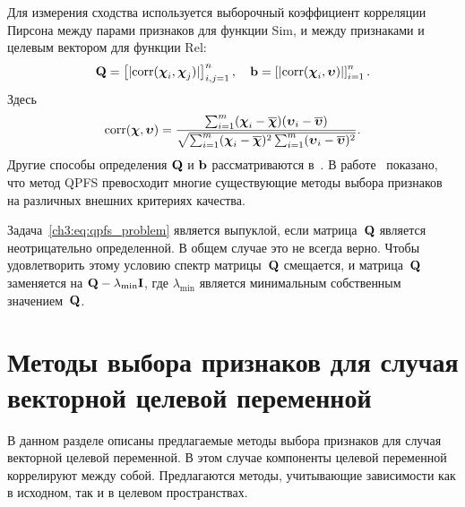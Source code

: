 Для измерения сходства используется выборочный коэффициент корреляции Пирсона между парами признаков для функции Sim, и между признаками и целевым вектором для функции Rel:
\begin{equation}
	\mathbf{Q} = \left[|\text{corr}(\boldsymbol{\chi}_i, \boldsymbol{\chi}_j)|\right]_{i,j=1}^n, \quad \mathbf{b} = \left[|\text{corr}(\boldsymbol{\chi}_i, \boldsymbol{\upsilon})|\right]_{i=1}^n.
	\label{ch3:eq:qpfs_1d_qb}
\end{equation}
Здесь
\begin{equation*}
\text{corr}(\boldsymbol{\chi}, \boldsymbol{\upsilon}) = \frac{\sum_{i=1}^m(\boldsymbol{\chi}_i - \overline{\boldsymbol{\chi}})( \boldsymbol{\upsilon}_i - \overline{\boldsymbol{\upsilon}})}{\sqrt{\sum_{i=1}^m(\boldsymbol{\chi}_i - \overline{\boldsymbol{\chi}})^2\sum_{i=1}^m(\boldsymbol{\upsilon}_i - \overline{\boldsymbol{\upsilon}})^2}}.
\end{equation*}
Другие способы определения $\mathbf{Q}$ и $\mathbf{b}$ рассматриваются в~\cite{katrutsa2017comprehensive}. 
В работе~\cite{katrutsa2017comprehensive} показано, что метод QPFS превосходит многие существующие методы выбора признаков на различных внешних критериях качества.

Задача~\eqref{ch3:eq:qpfs_problem} является выпуклой, если матрица~$\mathbf{Q}$ является неотрицательно определенной. В общем случае это не всегда верно. 
Чтобы удовлетворить этому условию спектр матрицы~$\mathbf{Q}$ смещается, и матрица~$\mathbf{Q}$ заменяется на $\mathbf{Q} - \lambda_{\text{min}} \mathbf{I}$, где $\lambda_{\text{min}} $ является минимальным собственным значением~$\mathbf{Q}$.

\section{Методы выбора признаков для случая векторной целевой переменной}
\label{sec:ch3:mqpfs_feature_selection}

В данном разделе описаны предлагаемые методы выбора признаков для случая векторной целевой переменной.
В этом случае компоненты целевой переменной коррелируют между собой. 
Предлагаются методы, учитывающие зависимости как в исходном, так и в целевом пространствах.


